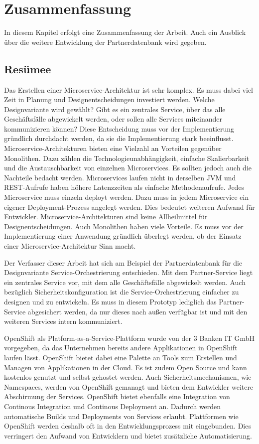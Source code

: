 \chapter{Zusammenfassung}
In diesem Kapitel erfolgt eine Zusammenfassung der Arbeit. Auch ein Ausblick über die weitere Entwicklung der Partnerdatenbank wird gegeben.

\section{Resümee}
Das Erstellen einer Microservice-Architektur ist sehr komplex. Es muss dabei viel Zeit in Planung und Designentscheidungen investiert werden. Welche Designvariante wird gewählt? Gibt es ein zentrales Service, über das alle Geschäftsfälle abgewickelt werden, oder sollen alle Services miteinander kommunizieren können? Diese Entscheidung muss vor der Implementierung gründlich durchdacht werden, da sie die Implementierung stark beeinflusst.
Microservice-Architekturen bieten eine Vielzahl an Vorteilen gegenüber Monolithen. Dazu zählen die Technologieunabhängigkeit, einfache Skalierbarkeit und die Austauschbarkeit von einzelnen Microservices. Es sollten jedoch auch die Nachteile bedacht werden. Microservices laufen nicht in derselben JVM und REST-Aufrufe haben höhere Latenzzeiten als einfache Methodenaufrufe. Jedes Microservice muss einzeln deployt werden. Dazu muss in jedem Microservice ein eigener Deployment-Prozess angelegt werden. Dies bedeutet weiteren Aufwand für Entwickler. Microservice-Architekturen sind keine Allheilmittel für Designentscheidungen. Auch Monolithen haben viele Vorteile. Es muss vor der Implementierung einer Anwendung gründlich überlegt werden, ob der Einsatz einer Microservice-Architektur Sinn macht.

Der Verfasser dieser Arbeit hat sich am Beispiel der Partnerdatenbank für die Designvariante Service-Orchestrierung entschieden. Mit dem Partner-Service liegt ein zentrales Service vor, mit dem alle Geschäftsfälle abgewickelt werden. Auch bezüglich Sicherheitskonfiguration ist die Service-Orchestrierung einfacher zu designen und zu entwickeln. Es muss in diesem Prototyp lediglich das Partner-Service abgesichert werden, da nur dieses nach außen verfügbar ist und mit den weiteren Services intern kommuniziert.

OpenShift als Platform-as-a-Service-Plattform wurde von der 3 Banken IT GmbH vorgegeben, da das Unternehmen bereits andere Applikationen in OpenShift laufen lässt. OpenShift bietet dabei eine Palette an Tools zum Erstellen und Managen von Applikationen in der Cloud. Es ist zudem Open Source und kann kostenlos genutzt und selbst gehostet werden. Auch Sicherheitsmechanismen, wie Namespaces, werden von OpenShift gemanagt und bieten dem Entwickler weitere Abschirmung der Services.
OpenShift bietet ebenfalls eine Integration von Continous Integration und Continous Deployment an. Dadurch werden automatische Builds und Deployments von Services erlaubt. Plattformen wie OpenShift werden deshalb oft in den Entwicklungsprozess mit eingebunden. Dies verringert den Aufwand von Entwicklern und bietet zusätzliche Automatisierung.

